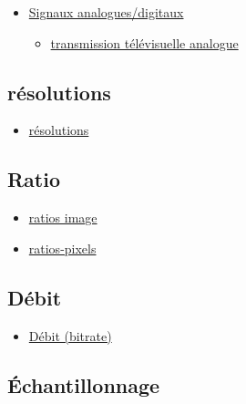 \documentclass[
]{book}
\providecommand{\tightlist}{%
  \setlength{\itemsep}{0pt}\setlength{\parskip}{0pt}}
\begin{document}
\begin{itemize}
\tightlist
\item
  \href{https://en.wikipedia.org/wiki/Video\#Analog_video}{Signaux analogues/digitaux}

  \begin{itemize}
  \tightlist
  \item
    \href{https://en.wikipedia.org/wiki/Analog_television}{transmission télévisuelle analogue}
  \end{itemize}
\end{itemize}

\hypertarget{ruxe9solutions}{%
\subsection{résolutions}\label{ruxe9solutions}}

\begin{itemize}
\tightlist
\item
  \href{https://en.wikipedia.org/wiki/Computer_display_standard\#/media/File:Vector_Video_Standards2.svg}{résolutions}
\end{itemize}

\hypertarget{ratio}{%
\subsection{Ratio}\label{ratio}}

\begin{itemize}
\tightlist
\item
  \href{https://en.wikipedia.org/wiki/Display_aspect_ratio}{ratios image}
\item
  \href{https://en.wikipedia.org/wiki/Pixel_aspect_ratio}{ratios-pixels}
\end{itemize}

\hypertarget{duxe9bit}{%
\subsection{Débit}\label{duxe9bit}}

\begin{itemize}
\tightlist
\item
  \href{https://en.wikipedia.org/wiki/Bit_rate\#Video}{Débit (bitrate)}
\end{itemize}

\hypertarget{uxe9chantillonnage}{%
\subsection{Échantillonnage}\label{uxe9chantillonnage}}
\end{document}
